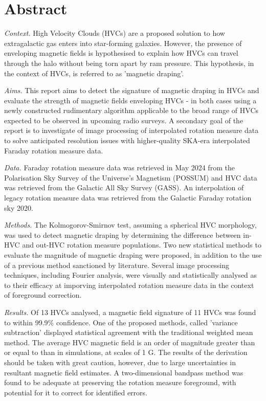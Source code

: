 \chapter*{Abstract}

\noindent\textit{Context.} High Velocity Clouds (HVCs) are a proposed solution to how extragalactic gas enters into star-forming galaxies. However, the presence of enveloping magnetic fields is hypothesised to explain how HVCs can travel through the halo without being torn apart by ram pressure. This hypothesis, in the context of HVCs, is referred to as 'magnetic draping'.

\noindent\textit{Aims.} This report aims to detect the signature of magnetic draping in HVCs and evaluate the strength of magnetic fields enveloping HVCs - in both cases using a newly constructed rudimentary algorithm applicable to the broad range of HVCs expected to be observed in upcoming radio surveys. A secondary goal of the report is to investigate of image processing of interpolated rotation measure data to solve anticipated resolution issues with higher-quality SKA-era interpolated Faraday rotation measure data.

\noindent\textit{Data.} Faraday rotation measure data was retrieved in May 2024 from the Polarisation Sky Survey of the Universe's Magnetism (POSSUM) and HVC data was retrieved from the Galactic All Sky Survey (GASS). An interpolation of legacy rotation measure data was retrieved from the Galactic Faraday rotation sky 2020.

\noindent\textit{Methods.} The Kolmogorov-Smirnov test, assuming a spherical HVC morphology, was used to detect magnetic draping by determining the difference between in-HVC and out-HVC rotation measure populations. Two new statistical methods to evaluate the magnitude of magnetic draping were proposed, in addition to the use of a previous method sanctioned by literature. Several image processing techniques, including Fourier analysis, were visually and statistically analysed as to their efficacy at imporving interpolated rotation measure data in the context of foreground correction.

\noindent\textit{Results.} Of 13 HVCs analysed, a magnetic field signature of 11 HVCs was found to within 99.9\% confidence. One of the proposed methods, called 'variance subtraction' displayed statistical agreement with the traditional weighted mean method. The average HVC magnetic field is an order of magnitude greater than or equal to than in simulations, at scales of 1 \textmu G. The results of the derivation should be taken with great caution, however, due to large uncertainties in resultant magnetic field estimates. A two-dimensional bandpass method was found to be adequate at preserving the rotation measure foreground, with potential for it to correct for identified errors.

\newpage 

\ %

\newpage


